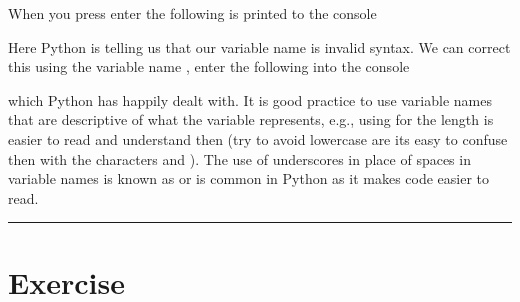 \documentclass[letterpaper,10pt,english]{jupyterBook}
\begin{document}
\begin{sphinxVerbatim}[commandchars=\\\{\}]
   
\end{sphinxVerbatim}

\sphinxAtStartPar
When you press enter the following is printed to the console

\begin{sphinxVerbatim}[commandchars=\\\{\}]
 \PYG{p}{[}\PYG{p}{]}    
   \PYG{p}{[}\PYG{p}{]}  
       
  
\end{sphinxVerbatim}

\sphinxAtStartPar
Here Python is telling us that our variable name is invalid syntax. We can correct this using the variable name , enter the following into the console

\begin{sphinxVerbatim}[commandchars=\\\{\}]
 \PYG{p}{[}\PYG{p}{]}   
\end{sphinxVerbatim}

\sphinxAtStartPar
which Python has happily dealt with. It is good practice to use variable names that are descriptive of what the variable represents, e.g., using  for the length is easier to read and understand then  (try to avoid lowercase  are its easy to confuse then with the characters  and ). The use of underscores \sphinxcode{\sphinxupquote{\_}} in place of spaces in variable names is known as  or  is common in Python as it makes code easier to read.


\bigskip\hrule\bigskip



\part{Exercise}
\label{\detokenize{_pages/1.2_Python_variables:exercise}} \label{exercise:python-variables-ex}
\end{document}
